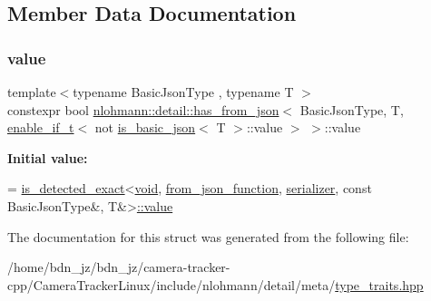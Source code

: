 \subsection{Member Data Documentation}
\mbox{\label{structnlohmann_1_1detail_1_1has__from__json_3_01_basic_json_type_00_01_t_00_01enable__if__t_3_01e29213c543deddccc314d19cbaf9f3b4_afb638d592883301228bcad21d83bf4aa}} 
\subsubsection{\texorpdfstring{value}{value}}
{\footnotesize\ttfamily template$<$typename Basic\+Json\+Type , typename T $>$ \\
constexpr bool \hyperlink{structnlohmann_1_1detail_1_1has__from__json}{nlohmann\+::detail\+::has\+\_\+from\+\_\+json}$<$ Basic\+Json\+Type, T, \hyperlink{namespacenlohmann_1_1detail_a02bcbc878bee413f25b985ada771aa9c}{enable\+\_\+if\+\_\+t}$<$ not \hyperlink{structnlohmann_1_1detail_1_1is__basic__json}{is\+\_\+basic\+\_\+json}$<$ T $>$\+::value $>$ $>$\+::value\hspace{0.3cm}{\ttfamily [static]}}

{\bfseries Initial value\+:}
\begin{DoxyCode}
=
        \hyperlink{namespacenlohmann_1_1detail_a7542b4dbac07817fd4849ecfa4619def}{is\_detected\_exact}<\hyperlink{namespacenlohmann_1_1detail_a59fca69799f6b9e366710cb9043aa77d}{void}, \hyperlink{namespacenlohmann_1_1detail_a1711ee5cef66a0523055c8d9f024f322}{from\_json\_function}, 
      \hyperlink{structnlohmann_1_1detail_1_1has__from__json_3_01_basic_json_type_00_01_t_00_01enable__if__t_3_01e29213c543deddccc314d19cbaf9f3b4_ab17cea1be422b8985fc19942809560ed}{serializer},
        \textcolor{keyword}{const} BasicJsonType&, T&>\hyperlink{structnlohmann_1_1detail_1_1has__from__json_3_01_basic_json_type_00_01_t_00_01enable__if__t_3_01e29213c543deddccc314d19cbaf9f3b4_afb638d592883301228bcad21d83bf4aa}{::value}
\end{DoxyCode}


The documentation for this struct was generated from the following file\+:\begin{DoxyCompactItemize}
\item 
/home/bdn\+\_\+jz/bdn\+\_\+jz/camera-\/tracker-\/cpp/\+Camera\+Tracker\+Linux/include/nlohmann/detail/meta/\hyperlink{type__traits_8hpp}{type\+\_\+traits.\+hpp}\end{DoxyCompactItemize}
